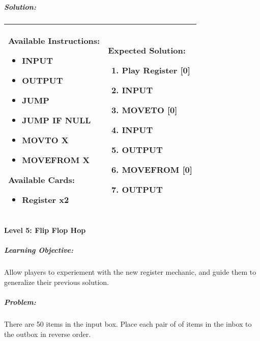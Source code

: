 \subparagraph{Solution:} 
\begin{center}
    \begin{tabular}{ | m{5cm} | m{9cm} | } 
        \hline
            \textbf{Available Instructions:} 
            \begin{itemize}
                \setlength\itemsep{-.35em}
                \item INPUT
                \item OUTPUT
                \item JUMP
                \item JUMP IF NULL
                \item MOVTO X
                \item MOVEFROM X
            \end{itemize}
            \textbf{Available Cards:} 
            \begin{itemize}
                \setlength\itemsep{-.35em}
                \item Register x2
            \end{itemize}& 
            \textbf{Expected Solution:} 
            \begin{enumerate}
                \setlength\itemsep{-.35em}
                \item Play Register [0]
                \item INPUT
                \item MOVETO [0]
                \item INPUT
                \item OUTPUT
                \item MOVEFROM [0] 
                \item OUTPUT
            \end{enumerate}
            \\
        \hline
    \end{tabular}
\end{center}

\paragraph{Level 5: Flip Flop Hop}
\subparagraph{Learning Objective:} Allow players to experiement with the new register mechanic, and guide them to generalize their previous solution.

\subparagraph{Problem:} There are 50 items in the input box. Place each pair of of items in the inbox to the outbox in reverse order.

